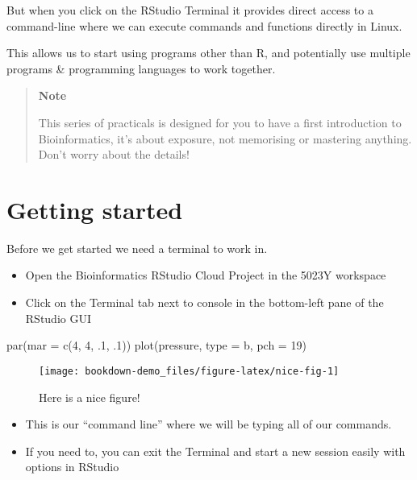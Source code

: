 \documentclass[
]{book}
\newenvironment{Shaded}{\begin{snugshade}}{\end{snugshade}}
\newcommand{\AttributeTok}[1]{\textcolor[rgb]{0.77,0.63,0.00}{#1}}
\newcommand{\DecValTok}[1]{\textcolor[rgb]{0.00,0.00,0.81}{#1}}
\newcommand{\FunctionTok}[1]{\textcolor[rgb]{0.00,0.00,0.00}{#1}}
\newcommand{\NormalTok}[1]{#1}
\newcommand{\StringTok}[1]{\textcolor[rgb]{0.31,0.60,0.02}{#1}}
\begin{document}
But when you click on the RStudio Terminal it provides direct access to a command-line where we can execute commands and functions directly in Linux.

This allows us to start using programs other than R, and potentially use multiple programs \& programming languages to work together.

\begin{quote}
\textbf{Note}

This series of practicals is designed for you to have a first introduction to Bioinformatics, it's about exposure, not memorising or mastering anything. Don't worry about the details!
\end{quote}

\hypertarget{getting-started}{%
\section{Getting started}\label{getting-started}}

Before we get started we need a terminal to work in.

\begin{itemize}
\item
  Open the Bioinformatics RStudio Cloud Project in the 5023Y workspace
\item
  Click on the Terminal tab next to console in the bottom-left pane of the RStudio GUI
\end{itemize}

\begin{Shaded}
\begin{Highlighting}[]
\FunctionTok{par}\NormalTok{(}\AttributeTok{mar =} \FunctionTok{c}\NormalTok{(}\DecValTok{4}\NormalTok{, }\DecValTok{4}\NormalTok{, .}\DecValTok{1}\NormalTok{, .}\DecValTok{1}\NormalTok{))}
\FunctionTok{plot}\NormalTok{(pressure, }\AttributeTok{type =} \StringTok{\textquotesingle{}b\textquotesingle{}}\NormalTok{, }\AttributeTok{pch =} \DecValTok{19}\NormalTok{)}
\end{Highlighting}
\end{Shaded}

\begin{figure}

{\centering \texttt{[image: bookdown-demo\_files/figure-latex/nice-fig-1]} 

}

\caption{Here is a nice figure!}\label{fig:nice-fig}
\end{figure}

\begin{itemize}
\item
  This is our ``command line'' where we will be typing all of our commands.
\item
  If you need to, you can exit the Terminal and start a new session easily with options in RStudio
\end{itemize}
\end{document}
